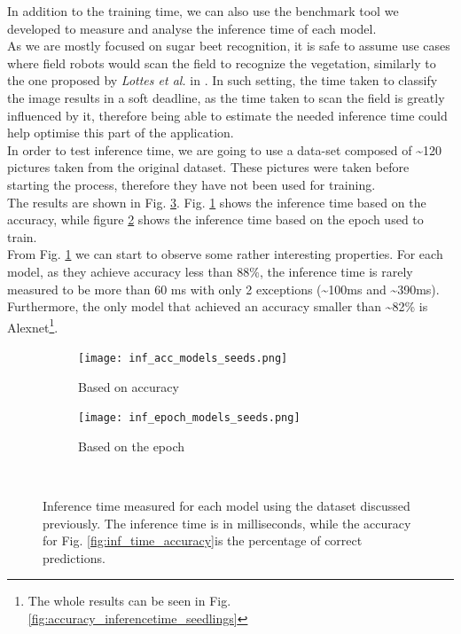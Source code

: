 In addition to the training time, we can also use the benchmark tool we developed to measure and analyse the inference time of each model.\\
As we are mostly focused on sugar beet recognition, it is safe to assume use cases where field robots would scan the field to recognize the vegetation, similarly to the one proposed by \textit{Lottes et al.} in \cite{7487720}. In such setting, the time taken to classify the image results in a soft deadline, as the time taken to scan the field is greatly influenced by it, therefore being able to estimate the needed inference time could help optimise this part of the application. \\
In order to test inference time, we are going to use a data-set composed of \textasciitilde120 pictures taken from the original dataset. These pictures were taken before starting the process, therefore they have not been used for training. \\
The results are shown in Fig. \ref{fig:inf_time_epoch_seeds}. Fig. \ref{fig:inf_acc_models_seeds} shows the inference time based on the accuracy, while figure \ref{fig:inf_epoch_models_seeds} shows the inference time based on the epoch used to train. \\
From Fig. \ref{fig:inf_acc_models_seeds} we can start to observe some rather interesting properties. For each model, as they achieve accuracy less than 88\%, the inference time is rarely measured to be more than 60 ms with only 2 exceptions (\textasciitilde100ms and \textasciitilde390ms). Furthermore, the only model that achieved an accuracy smaller than \textasciitilde82\% is Alexnet\footnote{The whole results can be seen in Fig. \ref{fig:accuracy_inferencetime_seedlings}}.
\begin{figure}[h]
     \begin{subfigure}{0.5\textwidth}
	    \texttt{[image: inf\_acc\_models\_seeds.png]}
	    \caption{Based on accuracy}
         \label{fig:inf_acc_models_seeds}
     \end{subfigure}
     \hfill
     \begin{subfigure}{0.5\textwidth}
	    \texttt{[image: inf\_epoch\_models\_seeds.png]}
	    \caption{Based on the epoch}
        \label{fig:inf_epoch_models_seeds}
     \end{subfigure}\\
     \caption[Inference time measured for each model]{Inference time measured for each model using the dataset discussed previously. The inference time is in milliseconds, while the accuracy for Fig. \ref{fig:inf_time_accuracy}is the percentage of correct predictions.}
        \label{fig:inf_time_epoch_seeds}
\end{figure}


